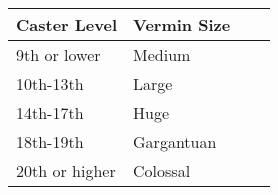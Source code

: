 \begin{longtable}{llll}
\hline
\multicolumn{1}{|p{0.938in}|}{\begin{minipage}[t]{0.938in}\raggedright
\textbf{Caster Level}\end{minipage}} & \multicolumn{1}{p{0.879in}|}{\begin{minipage}[t]{0.879in}\raggedright
\textbf{Vermin Size}\end{minipage}}\\
\hline
\multicolumn{1}{p{0.069in}|}{\begin{minipage}[t]{0.069in}\raggedright
9th or lower\end{minipage}} & \multicolumn{1}{p{0.069in}|}{\begin{minipage}[t]{0.069in}\raggedright
Medium\end{minipage}}\\
\hline
\multicolumn{1}{|p{0.938in}|}{\begin{minipage}[t]{0.938in}\raggedright
10th-13th\end{minipage}} & \multicolumn{1}{p{0.879in}|}{\begin{minipage}[t]{0.879in}\raggedright
Large\end{minipage}}\\
\hline
\multicolumn{1}{p{0.069in}|}{\begin{minipage}[t]{0.069in}\raggedright
14th-17th\end{minipage}} & \multicolumn{1}{p{0.069in}|}{\begin{minipage}[t]{0.069in}\raggedright
Huge\end{minipage}}\\
\hline
\multicolumn{1}{|p{0.938in}|}{\begin{minipage}[t]{0.938in}\raggedright
18th-19th\end{minipage}} & \multicolumn{3}{p{1.018in}|}{\begin{minipage}[t]{1.018in}\raggedright
Gargantuan\end{minipage}}\\
\hline
\multicolumn{1}{p{0.069in}|}{\begin{minipage}[t]{0.069in}\raggedright
20th or higher\end{minipage}} & \multicolumn{1}{p{0.069in}|}{\begin{minipage}[t]{0.069in}\raggedright
Colossal\end{minipage}}\\
\hline
\end{longtable}

